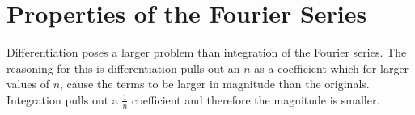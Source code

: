 \documentclass{report}
\theoremstyle{definition}
\theoremstyle{remark}
\begin{document}
\section{Properties of the Fourier Series}
Differentiation poses a larger problem than integration of the Fourier series. The reasoning for this is differentiation pulls out an $n$ as a coefficient which for larger values of $n$, cause the terms to be larger in magnitude than the originals. Integration pulls out a $\frac{1}{n}$ coefficient and therefore the magnitude is smaller.
\end{document}
